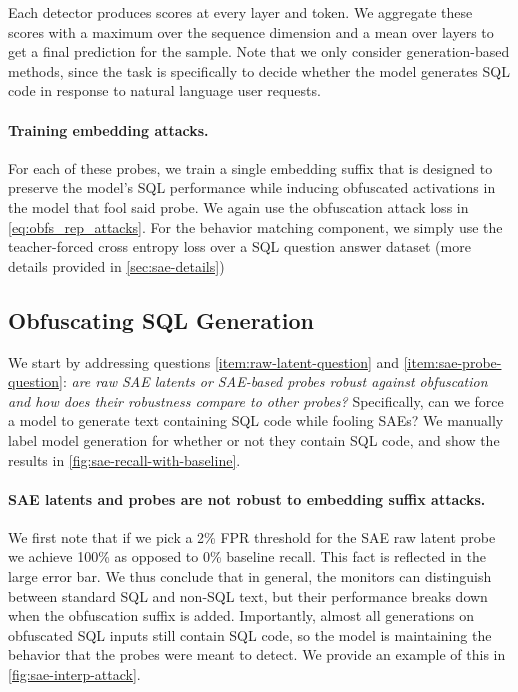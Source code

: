 \documentclass{article}
\begin{document}
Each detector produces scores at every layer and token. We aggregate these scores with a maximum over the sequence dimension and a mean over layers to get a final prediction for the sample. Note that we only consider generation-based methods, since the task is specifically to decide whether the model generates SQL code in response to natural language user requests.

\paragraph{Training embedding attacks.} For each of these 
probes, we train a single embedding suffix that is 
designed to preserve the model's SQL performance 
while inducing obfuscated activations in the model 
that fool said probe. We again use the obfuscation attack loss in 
\cref{eq:obfs_rep_attacks}. For the behavior 
matching component, we simply use the teacher-forced 
cross entropy loss over a SQL question answer 
dataset (more details provided in \cref{sec:sae-details})

\subsection{Obfuscating SQL Generation}
\label{sec:obf-seq-gen}
We start by addressing questions \ref{item:raw-latent-question} 
and \ref{item:sae-probe-question}: \emph{are raw SAE latents or
SAE-based probes robust against obfuscation and how 
does their robustness compare to other probes?} Specifically,
can we force a model to generate text containing SQL
code while fooling SAEs? We manually label model
generation for whether or not they contain SQL code,
and show the results in \cref{fig:sae-recall-with-baseline}.




\paragraph{SAE latents and probes are not robust to embedding suffix attacks.} 
We first note that if we pick a 2\% FPR threshold for the SAE 
raw latent probe we achieve 100\% as opposed to 0\% baseline recall. 
This fact is reflected in the large error bar. We thus 
conclude that in general, the monitors can distinguish between
standard SQL and non-SQL text, but their 
performance breaks down when the obfuscation suffix is added. 
Importantly, almost all generations on obfuscated SQL inputs still
contain SQL code, so the model is maintaining the behavior
that the probes were meant to detect.
We provide an example of this in 
\cref{fig:sae-interp-attack}.
\end{document}
